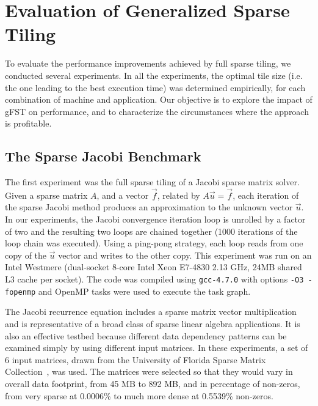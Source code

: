 \section{Evaluation of Generalized Sparse Tiling}
\label{sec:evaluation}
To evaluate the performance improvements achieved by full sparse tiling, we conducted several experiments. 
In all the experiments, the optimal tile size (i.e. the one leading to the best execution time) was determined empirically, for each combination of machine and application. Our objective is to explore 
the impact of gFST on %
performance, and to characterize the circumstances where the approach is profitable.


\subsection{The Sparse Jacobi Benchmark}
\label{sec:gfst-evaluation}


The first experiment was the full sparse tiling of a Jacobi sparse matrix solver. Given a sparse matrix $A$,
and a vector $\vec{f}$, related by $A\vec{u}=\vec{f}$, each iteration of the sparse Jacobi method produces
an approximation to the unknown vector $\vec{u}$. In our experiments, the Jacobi convergence 
iteration loop is unrolled by a factor of two and the resulting two loops are chained together 
(1000 iterations of the loop chain
was executed).
Using a ping-pong strategy, each loop reads from one copy of the $\vec{u}$ vector 
and writes to the other copy. This experiment was run on an Intel Westmere 
(dual-socket 8-core Intel Xeon E7-4830 2.13 GHz, 24MB shared L3 cache per socket).
The code was compiled using {\tt gcc-4.7.0} with options {\tt -O3 -fopenmp} and OpenMP tasks were used
to execute the task graph. 

The Jacobi recurrence equation includes a sparse matrix vector multiplication and is representative of a broad class of sparse linear algebra applications. It is also an effective testbed because different data dependency patterns can be examined simply by using different input matrices. In these experiments, a set of 6 input matrices, drawn from the University of Florida Sparse Matrix Collection~\cite{MatrixMarket}, was used. The matrices were selected so that they would vary in overall data footprint, from 45 MB to 892 MB, and in percentage of non-zeros, from very sparse at 0.0006\% to 
much more dense at 0.5539\% non-zeros. %

